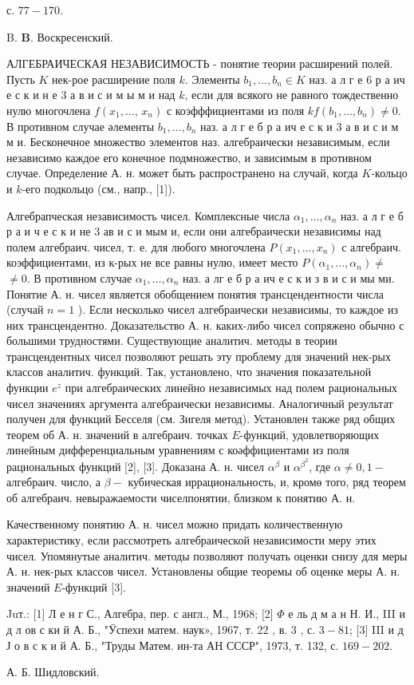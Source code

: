\documentclass[10pt]{article}
\begin{document}
с. $77-170$.

B. $\boldsymbol{B}$. Воскресенский.



АЛГЕБРАИЧЕСКАЯ НЕЗАВИСИМОСТЬ - понятие теории расширений полей. Пусть $K$ нек-рое расширение поля $k$. Элементы $b_{1}, \ldots, b_{n} \in K$ наз. а л г е 6 р а ич е с к и н е 3 а в и с и м ы м и над $k$, если для всякого не равного тождественно нулю многочлена $f\left(x_{1}, \ldots\right.$, $\left.x_{n}\right)$ с коэфффициентами из поля $k f\left(b_{1}, \ldots, b_{n}\right) \neq 0$. В противном случае әлементы $b_{1}, \ldots, b_{n}$ наз. а л г е б р а ич е с к и 3 а в и с и м м и. Бесконечное множество элементов наз. алгебраически независимым, если независимо каждое его конечное подмножество, и зависимым в противном случае. Определение А. н. может быть распространено на случай, когда $K$-кольцо и $k$-его подкольцо (см., напр., [1]).



Алгебрапческая независимость чисел. Комплексные числа $\alpha_{1}, \ldots, \alpha_{n}$ наз. а л г е б р а и ч е с к и не 3 ав и с и мым и, если они алгебраически независимы над полем алгебраич. чисел, т. е. для любого многочлена $P\left(x_{1}, \ldots, x_{n}\right)$ с алгебраич. коэффициентами, из к-рых не все равны нулю, имеет место $P\left(\alpha_{1}, \ldots, \alpha_{n}\right) \neq$ $\neq 0$. В противном случае $\alpha_{1}, \ldots, \alpha_{n}$ наз. а лг е б р а ич е с к и з в и с и мы ми. Понятие А. н. чисел является обобщением понятия трансцендентности числа (случай $n=1$ ). Если несколько чисел алгебраически независимы, то каждое из них трансцендентно. Доказательство А. н. каких-либо чисел сопряжено обычно с большими трудностями. Существующие аналитич. методы в теории трансцендентных чисел позволяют решать эту проблему для значений нек-рых классов аналитич. функций. Так, установлено, что значения показательной функции $e^{z}$ при алгебраических линейно независимых над полем рациональных чисел значениях аргумента алгебраически независимы. Аналогичный результат получен для функций Бесселя (см. Зигеля метод). Установлен также ряд общих теорем об А. н. значений в алгебраич. точках $E$-функций, удовлетворяющих линейным дифференциальным уравнениям с коәффициентами из поля рациональных функций [2], [3]. Доказана А. н. чисел $\alpha^{\beta}$ и $\alpha^{\beta^{2}}$, где $\alpha \neq 0,1-$ алгебраич. число, а $\beta-$ кубическая иррациональность, и, кромө того, ряд теорем об алгебраич. невыражаемости чиселпонятии, близком к понятию А. н.



Качественному понятию А. н. чисел можно придать количественную характеристику, если рассмотреть алгебраической независимости меру этих чисел. Упомянутые аналитич. методы позволяют получать оценки снизу для меры А. н. нек-рых классов чисел. Установлены общие теоремы об оценке меры А. н. значений $E$-функций [3].



Juт.: [1] Л е н г С., Алгебра, пер. с англ., М., 1968; [2] $\Phi$ е ль д м а н Н. И., III и д л ов с ки й А. Б., "Ӱспехи матем. наук», 1967, т. 22 , в. 3 , с. $3-81$; [3] III и д Ј о в с к и й А. Б., "Труды Матем. ин-та АН СССР", 1973, т. 132, с. $169-202$.



А. Б. Шидловский.
\end{document}
